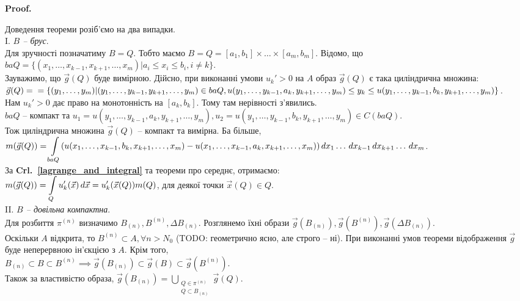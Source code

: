 \documentclass[a4paper, 10pt]{article}
\makeatletter
\def\qed{$\blacksquare$}
\theoremstyle{theoremdd}
\theoremstyle{theoremdd}
\theoremstyle{theoremdd}
\theoremstyle{theoremdd}
\theoremstyle{theoremdd}
\theoremstyle{theoremdd}
\theoremstyle{theoremdd}
\theoremstyle{theoremdd}
\theoremstyle{theoremdd}
\theoremstyle{theoremdd}
\theoremstyle{theoremdd}
\theoremstyle{theoremdd}
\theoremstyle{theoremdd}
\theoremstyle{theoremdd}
\theoremstyle{theoremdd}
\renewenvironment{proof}[1][Proof.\\]{\par
\pushQED{\hfill \qed}%
\normalfont \topsep6\p@\@plus6\p@\relax
\trivlist
\item\relax
{\bfseries
#1\@addpunct{.}}\hspace\labelsep\ignorespaces
}{%
\popQED\endtrivlist\@endpefalse
}
\newcommand\crlref[1]{\textbf{Crl.~\ref{#1}}}
\makeatother
\begin{document}
\begin{proof}
Доведення теореми розіб'ємо на два випадки.\\
I. \textit{$B$ -- брус}.\\
Для зручності позначатиму $B = Q$. Тобто маємо $B = Q = [a_1,b_1] \times \dots \times [a_m,b_m]$. Відомо, що $baQ = \{(x_1,\dots,x_{k-1},x_{k+1},\dots,x_m) | a_i \leq x_i \leq b_i, i \neq k\}$.\\
Зауважимо, що $\vec{g}(Q)$ буде вимірною. Дійсно, при виконанні умови $u_k'>0$ на $A$ образ $\vec{g}(Q)$ є така циліндрична множина: $\vec{g}(Q) = \\ =\{(y_1,\dots,y_m) | (y_1,\dots,y_{k-1},y_{k+1},\dots,y_m) \in baQ, u(y_1,\dots,y_{k-1},a_k,y_{k+1},\dots,y_m) \leq y_k \leq u(y_1,\dots,y_{k-1},b_k,y_{k+1},\dots,y_m)\}$.\\
Нам $u_k' > 0$ дає право на монотонність на $[a_k,b_k]$. Тому там нерівності з'явились.\\
$baQ$ -- компакт та $u_1 = u(y_1,\dots,y_{k-1},a_k,y_{k+1},\dots,y_m), u_2 = u(y_1,\dots,y_{k-1},b_k,y_{k+1},\dots,y_m) \in C(baQ)$.\\
Тож циліндрична множина $\vec{g}(Q)$ -- компакт та вимірна. Ба більше,\\
$m(\vec{g}(Q)) = \displaystyle\int\displaylimits_{baQ} (u(x_1,\dots,x_{k-1},b_k,x_{k+1},\dots,x_m) - u(x_1,\dots,x_{k-1},a_k,x_{k+1},\dots,x_m))\,dx_1\dots\,dx_{k-1}\,dx_{k+1}\dots\,dx_m$.\\
За \crlref{lagrange_and_integral} та теореми про середнє, отримаємо:\\
$m(\vec{g}(Q)) = \displaystyle\int\displaylimits_Q u'_k(\vec{x})\,d\vec{x} = u_k'(\vec{x}(Q)) m(Q)$, для деякої точки $\vec{x}(Q) \in Q$.
\bigskip \\
II. \textit{$B$ -- довільна компактна}.\\
Для розбиття $\pi^{(n)}$ визначимо $B_{(n)}, B^{(n)}, \Delta B_{(n)}$. Розглянемо їхні образи $\vec{g}(B_{(n)}), \vec{g}(B^{(n)}), \vec{g}(\Delta B_{(n)})$.\\
Оскільки $A$ відкрита, то $B^{(n)} \subset A, \forall n > N_0$ (TODO: геометрично ясно, але строго -- ні). При виконанні умов теореми відображення $\vec{g}$ буде неперервною ін'єкцією з $A$. Крім того,\\
$B_{(n)} \subset B \subset B^{(n)} \implies \vec{g}(B_{(n)}) \subset \vec{g}(B) \subset \vec{g}(B^{(n)})$.\\
Також за властивістю образа, $\vec{g}(B_{(n)}) = \displaystyle\bigcup_{\substack{Q \in \pi^{(n)} \\ Q \subset B_{(n)}}} \vec{g}(Q)$.\\

\end{proof}
\end{document}
